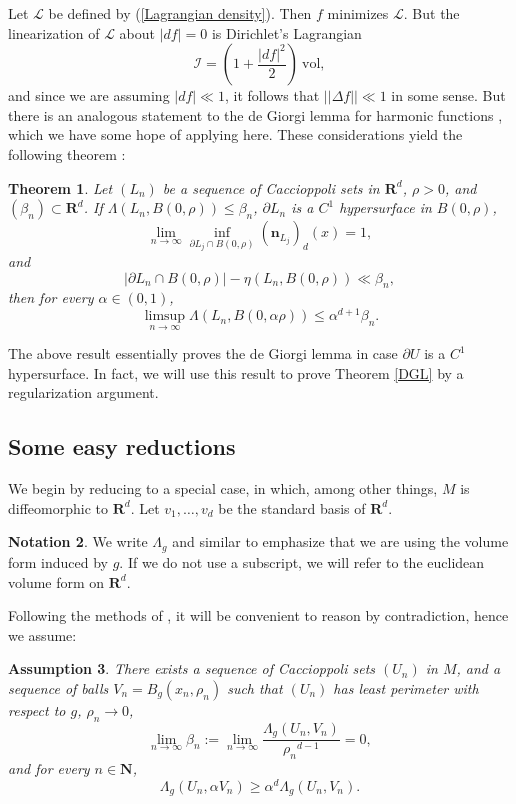 \documentclass[reqno,12pt,letterpaper]{amsart}
\newcommand{\NN}{\mathbf{N}}
\newcommand{\RR}{\mathbf{R}}
\newcommand{\normal}{\mathbf n}
\newcommand{\vol}{\mathrm{vol}}
\newtheorem{theorem}{Theorem}[section]
\newtheorem{assumption}[theorem]{Assumption}
\theoremstyle{definition}
\newtheorem{notation}[theorem]{Notation}
\numberwithin{equation}{section}
\begin{document}
Let $\mathscr L$ be defined by (\ref{Lagrangian density}). Then $f$ minimizes $\mathscr L$.
But the linearization of $\mathscr L$ about $|df| = 0$ is Dirichlet's Lagrangian
$$\mathscr I = (1 + \frac{|df|^2}{2}) ~\vol,$$
and since we are assuming $|df| \ll 1$, it follows that $||\Delta f|| \ll 1$ in some sense.
But there is an analogous statement to the de Giorgi lemma for harmonic functions \cite[Lemma 4.1]{Miranda66}, which we have some hope of applying here.
These considerations yield the following theorem \cite[Teorema 4.4]{Miranda66}:

\begin{theorem}\label{DGL C1}
Let $(L_n)$ be a sequence of Caccioppoli sets in $\RR^d$, $\rho > 0$, and $(\beta_n) \subset \RR^d$.
If $\Lambda(L_n, B(0, \rho)) \leq \beta_n$, $\partial L_n$ is a $C^1$ hypersurface in $B(0, \rho)$,
$$\lim_{n \to \infty} \inf_{\partial L_j \cap B(0, \rho)} (\normal_{L_j})_d(x) = 1,$$
and
$$|\partial L_n \cap B(0, \rho)| - \eta(L_n, B(0, \rho)) \ll \beta_n,$$
then for every $\alpha \in (0, 1)$,
$$\limsup_{n \to \infty} \Lambda(L_n, B(0, \alpha \rho)) \leq \alpha^{d + 1} \beta_n.$$
\end{theorem}

The above result essentially proves the de Giorgi lemma in case $\partial U$ is a $C^1$ hypersurface.
In fact, we will use this result to prove Theorem \ref{DGL} by a regularization argument.

\subsection{Some easy reductions}
We begin by reducing to a special case, in which, among other things, $M$ is diffeomorphic to $\RR^d$.
Let $v_1, \dots, v_d$ be the standard basis of $\RR^d$.

\begin{notation}
We write $\Lambda_g$ and similar to emphasize that we are using the volume form induced by $g$.
If we do not use a subscript, we will refer to the euclidean volume form on $\RR^d$.
\end{notation}

Following the methods of \cite[\S4-5]{Miranda66}, it will be convenient to reason by contradiction, hence we assume:

\begin{assumption} \label{DGL contradictor}
There exists a sequence of Caccioppoli sets $(U_n)$ in $M$, and a sequence of balls $V_n = B_g(x_n, \rho_n)$ such that $(U_n)$ has least perimeter with respect to $g$, $\rho_n \to 0$,
$$\lim_{n \to \infty} \beta_n := \lim_{n \to \infty} \frac{\Lambda_g(U_n, V_n)}{{\rho_n}^{d - 1}} = 0,$$
and for every $n \in \NN$,
\begin{equation}\label{contradiction DGL}
\Lambda_g(U_n, \alpha V_n) \geq \alpha^d \Lambda_g(U_n, V_n).
\end{equation}
\end{assumption}
\end{document}
